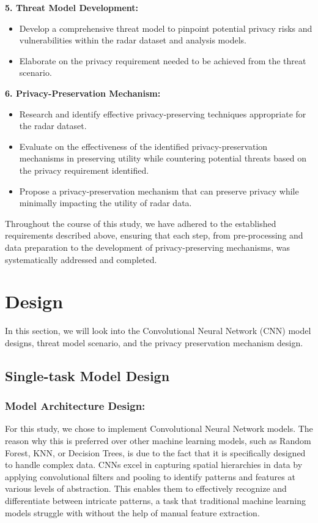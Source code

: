 \documentclass{l4proj}
\begin{document}
\textbf{5. Threat Model Development:}
\begin{itemize}
    \item Develop a comprehensive threat model to pinpoint potential privacy risks and vulnerabilities within the radar dataset and analysis models.
    \item Elaborate on the privacy requirement needed to be achieved from the threat scenario.
\end{itemize}

\textbf{6. Privacy-Preservation Mechanism:}
\begin{itemize}
    \item Research and identify effective privacy-preserving techniques appropriate for the radar dataset.
    \item Evaluate on the effectiveness of the identified privacy-preservation mechanisms in preserving utility while countering potential threats based on the privacy requirement identified.
    \item Propose a privacy-preservation mechanism that can preserve privacy while minimally impacting the utility of radar data.
\end{itemize}

Throughout the course of this study, we have adhered to the established requirements described above, ensuring that each step, from pre-processing and data preparation to the development of privacy-preserving mechanisms, was systematically addressed and completed. 

\section{Design}
In this section, we will look into the Convolutional Neural Network (CNN) model designs, threat model scenario, and the privacy preservation mechanism design.

\subsection{Single-task Model Design}
\subsubsection{Model Architecture Design:}
For this study, we chose to implement Convolutional Neural Network models. The reason why this is preferred over other machine learning models, such as Random Forest, KNN, or Decision Trees, is due to the fact that it is specifically designed to handle complex data. CNNs excel in capturing spatial hierarchies in data by applying convolutional filters and pooling to identify patterns and features at various levels of abstraction. This enables them to effectively recognize and differentiate between intricate patterns, a task that traditional machine learning models struggle with without the help of manual feature extraction. 
\end{document}
